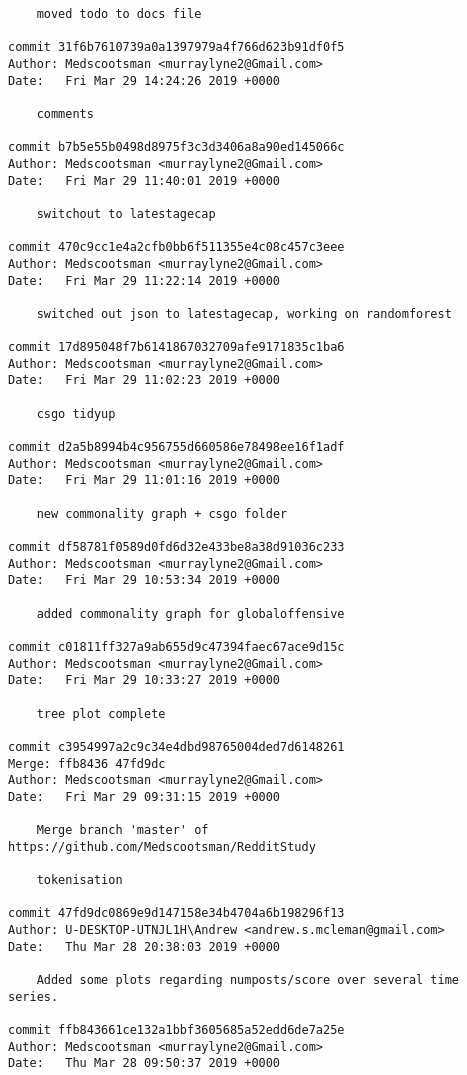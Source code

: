 \begin{lstlisting}
    moved todo to docs file

commit 31f6b7610739a0a1397979a4f766d623b91df0f5
Author: Medscootsman <murraylyne2@Gmail.com>
Date:   Fri Mar 29 14:24:26 2019 +0000

    comments

commit b7b5e55b0498d8975f3c3d3406a8a90ed145066c
Author: Medscootsman <murraylyne2@Gmail.com>
Date:   Fri Mar 29 11:40:01 2019 +0000

    switchout to latestagecap

commit 470c9cc1e4a2cfb0bb6f511355e4c08c457c3eee
Author: Medscootsman <murraylyne2@Gmail.com>
Date:   Fri Mar 29 11:22:14 2019 +0000

    switched out json to latestagecap, working on randomforest

commit 17d895048f7b6141867032709afe9171835c1ba6
Author: Medscootsman <murraylyne2@Gmail.com>
Date:   Fri Mar 29 11:02:23 2019 +0000

    csgo tidyup

commit d2a5b8994b4c956755d660586e78498ee16f1adf
Author: Medscootsman <murraylyne2@Gmail.com>
Date:   Fri Mar 29 11:01:16 2019 +0000

    new commonality graph + csgo folder

commit df58781f0589d0fd6d32e433be8a38d91036c233
Author: Medscootsman <murraylyne2@Gmail.com>
Date:   Fri Mar 29 10:53:34 2019 +0000

    added commonality graph for globaloffensive

commit c01811ff327a9ab655d9c47394faec67ace9d15c
Author: Medscootsman <murraylyne2@Gmail.com>
Date:   Fri Mar 29 10:33:27 2019 +0000

    tree plot complete

commit c3954997a2c9c34e4dbd98765004ded7d6148261
Merge: ffb8436 47fd9dc
Author: Medscootsman <murraylyne2@Gmail.com>
Date:   Fri Mar 29 09:31:15 2019 +0000

    Merge branch 'master' of https://github.com/Medscootsman/RedditStudy
    
    tokenisation

commit 47fd9dc0869e9d147158e34b4704a6b198296f13
Author: U-DESKTOP-UTNJL1H\Andrew <andrew.s.mcleman@gmail.com>
Date:   Thu Mar 28 20:38:03 2019 +0000

    Added some plots regarding numposts/score over several time series.

commit ffb843661ce132a1bbf3605685a52edd6de7a25e
Author: Medscootsman <murraylyne2@Gmail.com>
Date:   Thu Mar 28 09:50:37 2019 +0000


\end{lstlisting}
